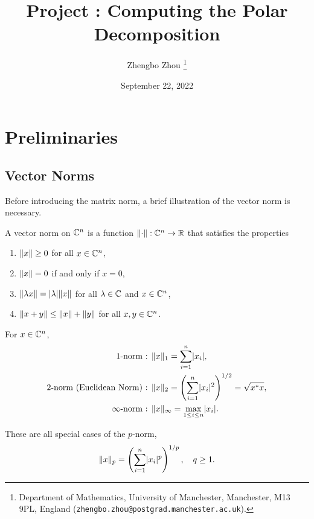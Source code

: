 \documentclass[12pt]{article}
\title{Project : Computing the Polar Decomposition}
\author{Zhengbo Zhou%
    \thanks{%
        Department of Mathematics,
        University of Manchester,
        Manchester, M13 9PL, England
        (\texttt{zhengbo.zhou@postgrad.manchester.ac.uk}).
    }
}
\date{September 22, 2022}
\begin{document}
\maketitle

\section{Preliminaries}\label{sec:norms-svd}

\subsection{Vector Norms} \label{subsec:vector-norms}

Before introducing the matrix norm, a brief illustration of the vector norm is necessary.

\begin{definition}
   \label{def:vector-norm}
  A vector norm on $\mathbb{C}^n$ is a function $\|{\cdot}\| : \mathbb{C}^n \to \mathbb{R}$  that  satisfies the  properties
  \begin{enumerate}
    \item $\|{x}\| \geq 0$ for all $x\in\mathbb{C}^n$,
    \item $\|{x}\| = 0$ if and only if $x = 0$,
    \item $\|{\lambda x}\| = \lvert\lambda\rvert \|{x}\|$ for all $\lambda \in \mathbb{C}$ and $x \in \mathbb{C}^n$,
    \item $\|{x + y}\| \leq \|{x}\| + \|{y}\|$ for all $x,y\in \mathbb{C}^n$.
  \end{enumerate}
\end{definition}

\begin{example}
    For $x\in\mathbb{C}^n$, 
    \begin{equation}\notag
        \begin{aligned}
            \text{1-norm : }& \|{x}\|_1 = \sum_{i = 1}^n \lvert x_i\rvert,\\
            \text{2-norm (Euclidean Norm) : }& \|{x}\|_2 = \left(\sum_{i = 1}^n \lvert x_i\rvert^2\right)^{1/2} = \sqrt{x^* x},\\
            \text{$\infty$-norm : } & \|{x}\|_{\infty} = \max_{1\leq i \leq n} \lvert x_i\rvert.
        \end{aligned}
    \end{equation}
    
    These are all special cases of the $p$-norm,
    \begin{equation}\label{eq:vector-p-norm}
        \|{x}\|_p = \left(\sum_{i = 1}^n \lvert x_i\rvert^p\right)^{1/p},\quad q \geq 1.
    \end{equation}
\end{example}
\end{document}
